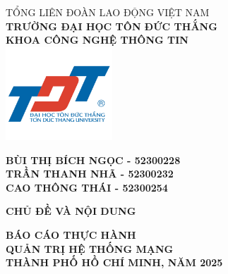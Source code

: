 \begin{titlepage}
    \centering
    \vspace*{0cm}
    {\Large TỔNG LIÊN ĐOÀN LAO ĐỘNG VIỆT NAM} \\
    \vspace{0.2cm}
    {\Large \textbf{TRƯỜNG ĐẠI HỌC TÔN ĐỨC THẮNG}} \\
    \vspace{0.2cm}
    {\Large \textbf{KHOA CÔNG NGHỆ THÔNG TIN}} \\
    \vspace{0.25cm}
    \includegraphics[width=0.3\textwidth]{./media/logo.png} %
    \vspace{0.25cm}
    
    {\large \textbf{BÙI THỊ BÍCH NGỌC - 52300228}} \\
    {\large \textbf{TRẦN THANH NHÃ - 52300232}} \\
    {\large \textbf{CAO THÔNG THÁI - 52300254}} \\
    \vspace{1.75cm}

    {\fontsize{24pt}{30pt}\selectfont \bfseries %
    CHỦ ĐỀ VÀ NỘI DUNG} \\
    \vspace{1.5cm} %
    
    {\fontsize{21pt}{25pt}\selectfont \textbf{BÁO CÁO THỰC HÀNH}} \\
    \vspace{0.5cm}
    {\fontsize{21pt}{24pt}\selectfont \textbf{QUẢN TRỊ HỆ THỐNG MẠNG}} \\
    
     \vfill %
    {\large \textbf{THÀNH PHỐ HỒ CHÍ MINH, NĂM 2025}}
\end{titlepage}


